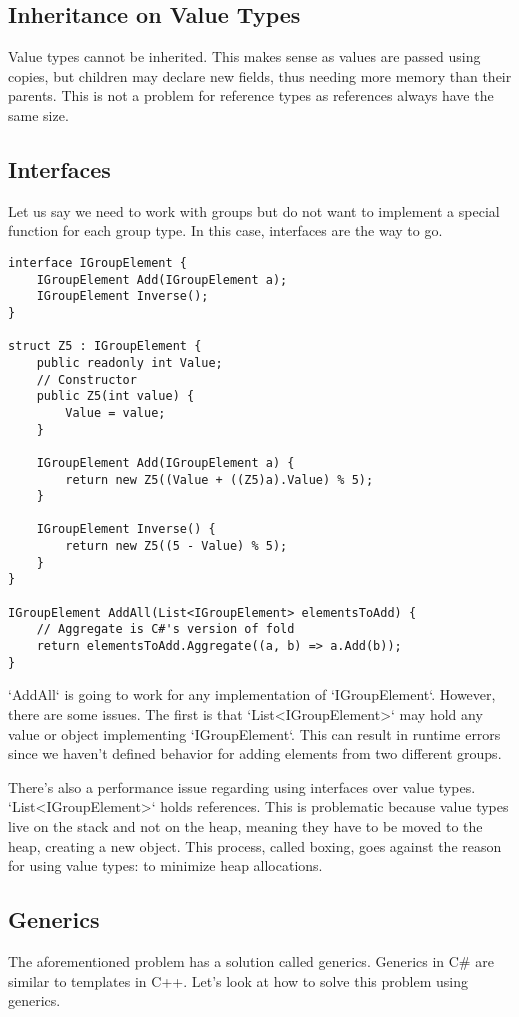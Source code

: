 \subsection{Inheritance on Value Types}
Value types cannot be inherited. This makes sense as values are passed using copies, but children may declare new fields, thus needing more memory than their parents. This is not a problem for reference types as references always have the same size.

\subsection{Interfaces}

Let us say we need to work with groups but do not want to implement a special function for each group type. In this case, interfaces are the way to go.

\begin{lstlisting}
interface IGroupElement {
    IGroupElement Add(IGroupElement a);
    IGroupElement Inverse();
}

struct Z5 : IGroupElement {
    public readonly int Value;
    // Constructor
    public Z5(int value) {
        Value = value;
    }

    IGroupElement Add(IGroupElement a) {
        return new Z5((Value + ((Z5)a).Value) % 5);
    }

    IGroupElement Inverse() {
        return new Z5((5 - Value) % 5);
    }
}

IGroupElement AddAll(List<IGroupElement> elementsToAdd) {
    // Aggregate is C#'s version of fold
    return elementsToAdd.Aggregate((a, b) => a.Add(b));
}
\end{lstlisting}

`AddAll` is going to work for any implementation of `IGroupElement`. However, there are some issues. The first is that `List<IGroupElement>` may hold any value or object implementing `IGroupElement`. This can result in runtime errors since we haven't defined behavior for adding elements from two different groups.

There's also a performance issue regarding using interfaces over value types. `List<IGroupElement>` holds references. This is problematic because value types live on the stack and not on the heap, meaning they have to be moved to the heap, creating a new object. This process, called boxing, goes against the reason for using value types: to minimize heap allocations.

\subsection{Generics}
The aforementioned problem has a solution called generics. Generics in C\# are similar to templates in C++. Let's look at how to solve this problem using generics.

